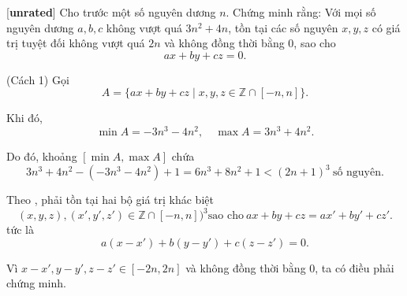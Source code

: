 \documentclass[../01-divisibility.tex]{subfiles}
\begin{document}
\begin{example*}\label{example:CHN-2015-TST1-D2-P2}[\textbf{unrated}]
	Cho trước một số nguyên dương \( n \). Chứng minh rằng: Với mọi số nguyên dương \( a, b, c \) không vượt quá \( 3n^2 + 4n \),
	tồn tại các số nguyên \( x, y, z \) có giá trị tuyệt đối không vượt quá \( 2n \) và không đồng thời bằng 0, sao cho
	\[
		ax + by + cz = 0.
	\]
\end{example*}

\begin{soln}(Cách 1)\footnotemark
	Gọi  
	\[
		A = \{ ax + by + cz \mid x, y, z \in \mathbb{Z} \cap [-n, n] \}.
	\]
	
	Khi đó,  
	\[
		\min A = -3n^3 - 4n^2, \quad \max A = 3n^3 + 4n^2.
	\]
	
	Do đó, khoảng \( [\min A, \max A] \) chứa  
	\[
		3n^3 + 4n^2 - (-3n^3 - 4n^2) + 1 = 6n^3 + 8n^2 + 1 < (2n+1)^3\ \text{số nguyên.}
	\]
	
	Theo , phải tồn tại hai bộ giá trị khác biệt  
	\[
		(x, y, z), (x', y', z') \in \mathbb{Z} \cap [-n, n])^3 \text{sao cho}\ ax + by + cz = ax' + by' + cz'.
	\]
	tức là  
	\[
		a(x - x') + b(y - y') + c(z - z') = 0.
	\]
	
	Vì \( x - x', y - y', z - z' \in [-2n, 2n] \) và không đồng thời bằng 0, ta có điều phải chứng minh.
\end{soln}

\end{document}
